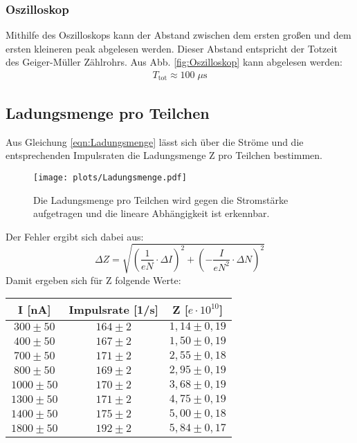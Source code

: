\subsubsection{Oszilloskop}
Mithilfe des Oszilloskops kann der Abstand zwischen dem ersten großen und dem ersten kleineren peak abgelesen werden.
Dieser Abstand entspricht der Totzeit des Geiger-Müller Zählrohrs.
Aus Abb. \ref{fig:Oszilloskop} kann abgelesen werden:
\begin{align}
    T_{\text{tot}} ≈ 100 \; \mu \text{s} \nonumber
\end{align}

\subsection{Ladungsmenge pro Teilchen}
Aus Gleichung \ref{eqn:Ladungsmenge} lässt sich über die Ströme und die entsprechenden Impulsraten die Ladungsmenge Z pro Teilchen bestimmen.
\begin{figure}
    \centering
    \texttt{[image: plots/Ladungsmenge.pdf]}
    \caption{Die Ladungsmenge pro Teilchen wird gegen die Stromstärke aufgetragen und die lineare Abhängigkeit ist erkennbar.}
    \label{fig:Ladungsmenge}
\end{figure}
Der Fehler ergibt sich dabei aus:
\begin{equation}
    \Delta Z = \sqrt{ \left( \frac{1}{eN} \cdot \Delta I \right)^2  + \left( -\frac{I}{eN^2}\cdot \Delta N \right)^2  } \nonumber
\end{equation}
Damit ergeben sich für Z folgende Werte:
\begin{table}[h]
\centering
\label{tab:Ladungen}
    \begin{tabular}{c c c }
        \toprule
        {I [nA]} & {Impulsrate [1/s]} & {Z [$e \cdot 10^{10}$]} \\
        \midrule
        $300 \pm 50$ & $164 \pm 2$ & $1,14 \pm 0,19$\\
        $400 \pm 50$ & $167 \pm 2$ & $1,50 \pm 0,19$\\
        $700 \pm 50$ & $171 \pm 2$ & $2,55 \pm 0,18$\\
        $800 \pm 50$ & $169 \pm 2$ & $2,95 \pm 0,19$\\
        $1000 \pm 50$ & $170 \pm 2$ & $3,68 \pm 0,19$\\
        $1300 \pm 50$ & $171 \pm 2$ & $4,75 \pm 0,19$\\
        $1400 \pm 50$ & $175 \pm 2$ & $5,00 \pm 0,18$\\
        $1800 \pm 50$ & $192 \pm 2$ & $5,84 \pm 0,17$\\
        \bottomrule
    \end{tabular}
\end{table}
